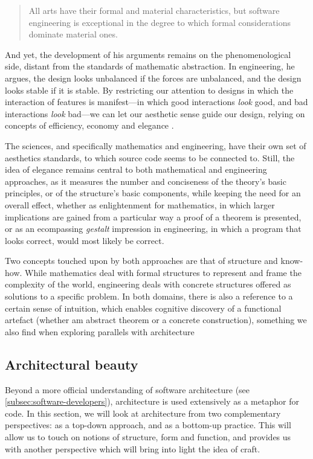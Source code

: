 \begin{quote}
  All arts have their formal and material characteristics, but software engineering is exceptional in the degree to which formal considerations dominate material ones. \citep{schummer_aesthetic_2009}
\end{quote}

And yet, the development of his arguments remains on the phenomenological side, distant from the standards of mathematic abstraction. In engineering, he argues, the design looks unbalanced if the forces are unbalanced, and the design looks stable if it is stable.  By restricting our attention to designs in which the interaction of features is manifest—in which good interactions \emph{look} good, and bad interactions \emph{look} bad—we can let our aesthetic sense guide our design, relying on concepts of efficiency, economy and elegance \citep{mclennan_who_1997}.

The sciences, and specifically mathematics and engineering, have their own set of aesthetics standards, to which source code seems to be connected to. Still, the idea of elegance remains central to both mathematical and engineering approaches, as it measures the number and conciseness of the theory's basic principles, or of the structure's basic components, while keeping the need for an overall effect, whether as enlightenment for mathematics, in which larger implications are gained from a particular way a proof of a theorem is presented, or as an ecompassing \emph{gestalt} impression in engineering, in which a program that looks correct, would most likely be correct.

Two concepts touched upon by both approaches are that of structure and know-how. While mathematics deal with formal structures to represent and frame the complexity of the world, engineering deals with concrete structures offered as solutions to a specific problem. In both domains, there is also a reference to a certain sense of intuition, which enables cognitive discovery of a functional artefact (whether am abstract theorem or a concrete construction), something we also find when exploring parallels with architecture

\subsection{Architectural beauty}
\label{subsec:beauty-architecture}

Beyond a more official understanding of software architecture (see \autoref{subsec:software-developers}), architecture is used extensively as a metaphor for code. In this section, we will look at architecture from two complementary perspectives: as a top-down approach, and as a bottom-up practice. This will allow us to touch on notions of structure, form and function, and provides us with another perspective which will bring into light the idea of craft.


